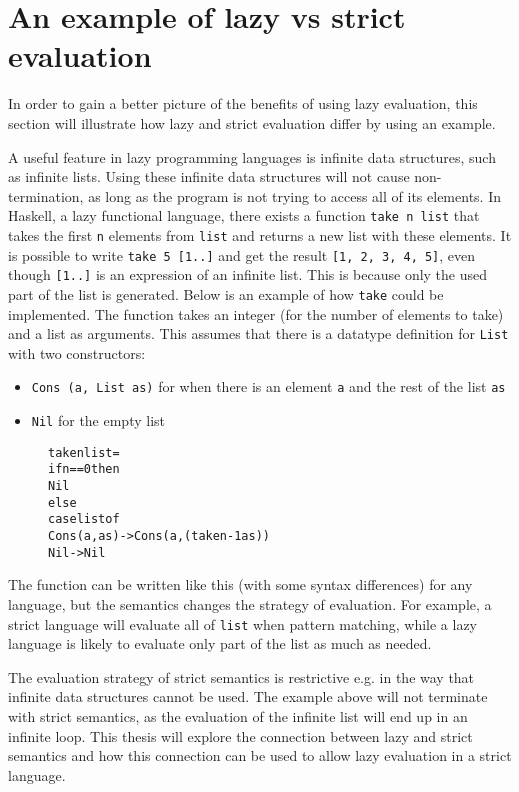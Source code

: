 \section{An example of lazy vs strict evaluation}
\label{intro:Example}
In order to gain a better picture of the benefits of using lazy evaluation,
this section will illustrate how lazy and strict evaluation differ by using
an example.

A useful feature in lazy programming languages is
infinite data structures, such as infinite lists. Using
these infinite data structures will not cause non-termination, as long as the
program is not trying to access all of its elements. In Haskell, a lazy
functional language, there exists a function \texttt{take n list} that takes the
first \texttt{n} elements from \texttt{list} and returns a new list with
these elements. It is possible to write \texttt{take 5 [1..]} and get the
result \texttt{[1, 2, 3, 4, 5]}, even though \texttt{[1..]} is
an expression of an infinite list. This is because only the used part of the
list is generated.
Below is an example of how \texttt{take} could be implemented. The function
takes an integer (for the number of elements to take) and a list as arguments.
This assumes that there is a datatype definition for \texttt{List} with two
constructors:
\begin{itemize}
  \item \texttt{Cons (a, List as)} for when there is an element \texttt{a} and the rest of the list \texttt{as}
  \item \texttt{Nil} for the empty list
\end{itemize}

\begin{figure}[H]
\begin{alltt}
  take n list =
    if n == 0 then
      Nil
    else
      case list of
        Cons (a, as) -> Cons (a, (take n-1 as))
        Nil          -> Nil
\end{alltt}
\end{figure}

\noindent The function can be written like this (with some syntax differences)
for any language, but the semantics
changes the strategy of evaluation. For example, a strict language will evaluate
all of \texttt{list} when pattern matching, while a lazy language is likely to
evaluate only part of the list as much as needed. 

The evaluation strategy of strict semantics is restrictive e.g. in the way that
infinite data structures cannot be used. The example above will not terminate
with strict semantics, as the evaluation of the infinite list will end up in an
infinite loop. This thesis will explore the connection between lazy and strict
semantics and how this connection can be used to allow lazy evaluation in a
strict language.
